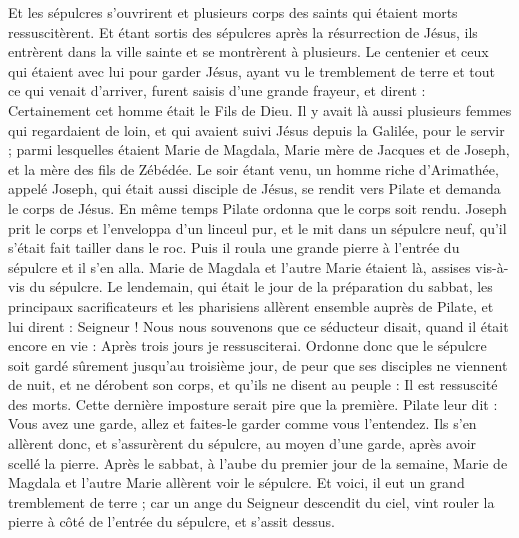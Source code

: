 \begin{multicols}{2}
Et les sépulcres s'ouvrirent et plusieurs corps des saints qui étaient morts ressuscitèrent.
Et étant sortis des sépulcres après la résurrection de Jésus, ils entrèrent dans la ville sainte et se montrèrent à plusieurs.
Le centenier et ceux qui étaient avec lui pour garder Jésus, ayant vu le tremblement de terre et tout ce qui venait d'arriver, furent saisis d'une grande frayeur, et dirent : Certainement cet homme était le Fils de Dieu.
Il y avait là aussi plusieurs femmes qui regardaient de loin, et qui avaient suivi Jésus depuis la Galilée, pour le servir ;
parmi lesquelles étaient Marie de Magdala, Marie mère de Jacques et de Joseph, et la mère des fils de Zébédée.
Le soir étant venu, un homme riche d'Arimathée, appelé Joseph, qui était aussi disciple de Jésus,
se rendit vers Pilate et demanda le corps de Jésus. En même temps Pilate ordonna que le corps soit rendu.
Joseph prit le corps et l'enveloppa d'un linceul pur,
et le mit dans un sépulcre neuf, qu'il s'était fait tailler dans le roc. Puis il roula une grande pierre à l'entrée du sépulcre et il s'en alla.
Marie de Magdala et l'autre Marie étaient là, assises vis-à-vis du sépulcre.
Le lendemain, qui était le jour de la préparation du sabbat, les principaux sacrificateurs et les pharisiens allèrent ensemble auprès de Pilate,
et lui dirent : Seigneur ! Nous nous souvenons que ce séducteur disait, quand il était encore en vie : Après trois jours je ressusciterai.
Ordonne donc que le sépulcre soit gardé sûrement jusqu'au troisième jour, de peur que ses disciples ne viennent de nuit, et ne dérobent son corps, et qu'ils ne disent au peuple : Il est ressuscité des morts. Cette dernière imposture serait pire que la première.
Pilate leur dit : Vous avez une garde, allez et faites-le garder comme vous l'entendez.
Ils s'en allèrent donc, et s'assurèrent du sépulcre, au moyen d'une garde, après avoir scellé la pierre.
\VerseOne{}Après le sabbat, à l'aube du premier jour de la semaine, Marie de Magdala et l'autre Marie allèrent voir le sépulcre.
Et voici, il eut un grand tremblement de terre ; car un ange du Seigneur descendit du ciel, vint rouler la pierre à côté de l'entrée du sépulcre, et s'assit dessus.

\end{multicols}
